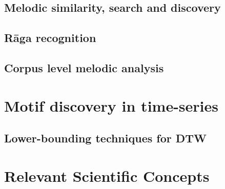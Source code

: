 \subsection{Melodic similarity, search and discovery}
\subsection{R\={a}ga recognition}
\subsection{Corpus level melodic analysis}

\section{Motif discovery in time-series}
\subsection{Lower-bounding techniques for DTW}

\section{{Relevant Scientific Concepts}}